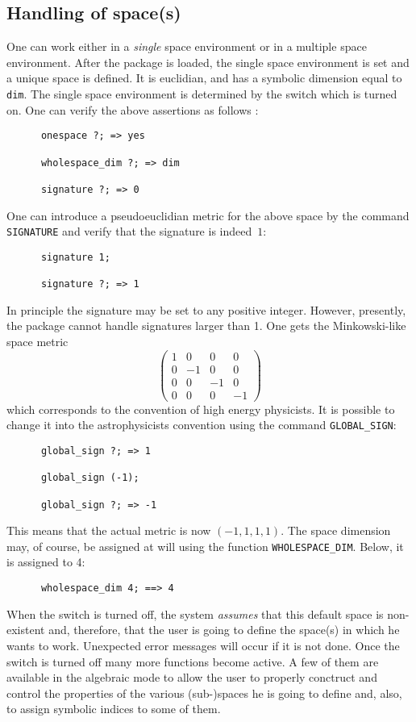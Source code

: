 \subsection{Handling of space(s)}
\hypertarget{switch:ONESPACE}{}
One can work either in a \emph{single} space environment or in
a multiple space environment. After the package is loaded, 
the single space environment is set and 
a unique space is defined. It is euclidian, and has a symbolic 
dimension equal to \texttt{dim}.
The single space environment is determined by the switch
 which is turned on. 
One can verify the above assertions as follows :
\begin{verbatim}
      onespace ?; => yes
      
      wholespace_dim ?; => dim

      signature ?; => 0
\end{verbatim}
One can introduce a pseudoeuclidian metric for the above space by the 
command \texttt{SIGNATURE} and 
verify that the signature is indeed~$1$:
\begin{verbatim}
      signature 1;

      signature ?; => 1
\end{verbatim}
In principle the signature may be set to any positive 
integer. However, presently,
the package cannot handle signatures larger than 1.
One gets the Minkowski-like space metric 
\begin{displaymath}
\left(\begin{array}{cccc}    
	1 & 0 & 0 & 0  \\
	0 & -1 & 0 & 0  \\
        0 & 0 & -1 & 0 \\
        0 & 0 & 0 & -1       
 \end{array}
\right)
\end{displaymath}
which corresponds to the convention of high energy physicists.
It is possible to change it into the  astrophysicists convention using 
the command  \texttt{GLOBAL\_SIGN}: 
\begin{verbatim}
      global_sign ?; => 1
      
      global_sign (-1);
 
      global_sign ?; => -1
\end{verbatim}
This means that the actual metric is now  $(-1,1,1,1)$.
The space dimension may, of course, be assigned at will using the function 
\texttt{WHOLESPACE\_DIM}. Below, it is assigned to 4: 
\begin{verbatim}
      wholespace_dim 4; ==> 4
\end{verbatim}
When the switch  is turned off, the system \emph{assumes} that this default
space is non-existent and, therefore, that the user is going to define the 
space(s) in which he wants to work.
Unexpected error messages will occur if it is not done.
Once the switch is turned off many more functions become active. A few of them are 
available in the algebraic mode to allow the user to properly conctruct 
and control the properties of the various (sub-)spaces he is going to define
and, also, to assign symbolic indices to some of them.


